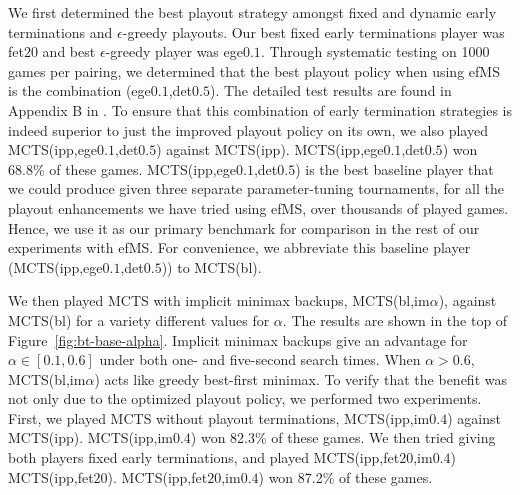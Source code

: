 \documentclass{article}
\begin{document}
We first determined the best playout strategy amongst fixed and dynamic early 
terminations and $\epsilon$-greedy playouts.
Our best fixed early terminations player was fet$20$ and best $\epsilon$-greedy player was ege$0.1$.
Through systematic testing on 1000 games per pairing, we determined that the best playout 
policy when using efMS is the combination (ege$0.1$,det$0.5$). 
The detailed test results are found in Appendix B in \cite{Lanctot14immcts-arxiv}.
To ensure that this combination of early termination strategies is indeed superior to just the improved 
playout policy on its own, we also played MCTS(ipp,ege$0.1$,det$0.5$) against MCTS(ipp). 
MCTS(ipp,ege$0.1$,det$0.5$) won 68.8\% of these games.
MCTS(ipp,ege$0.1$,det$0.5$) is the best baseline player that we could produce given three separate 
parameter-tuning tournaments, for all the playout enhancements we have tried using efMS, over 
thousands of played games. Hence, we use it as our primary benchmark for comparison in the 
rest of our experiments with efMS. 
For convenience, we abbreviate this baseline player (MCTS(ipp,ege$0.1$,det$0.5$)) to MCTS(bl). 


We then played MCTS with implicit minimax backups, MCTS(bl,im$\alpha$), against MCTS(bl) for a 
variety different values for $\alpha$. The results are shown in the top of Figure~\ref{fig:bt-base-alpha}.
Implicit minimax backups give an advantage for $\alpha \in [0.1,0.6]$ under both one- and five-second 
search times. 
When $\alpha > 0.6$, MCTS(bl,im$\alpha$) acts like greedy best-first minimax.
To verify that the benefit was not only due to the optimized playout policy, we performed two experiments. 
First, we played MCTS without playout terminations, MCTS(ipp,im$0.4$) against MCTS(ipp). 
MCTS(ipp,im$0.4$) won 82.3\% of these games. 
We then tried giving both players fixed early terminations, and played MCTS(ipp,fet$20$,im$0.4$) 
MCTS(ipp,fet$20$). MCTS(ipp,fet$20$,im$0.4$) won 87.2\% of these games.
\end{document}
